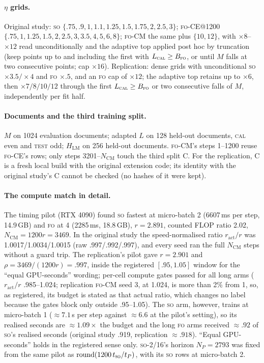 \documentclass[11pt]{article}
\newcommand{\FO}{\textsc{fo}}
\newcommand{\SO}{\textsc{so}}
\newcommand{\SOp}{\textsc{so}-2/16}
\begin{document}
\paragraph{$\eta$ grids.} Original study: \SO{} $\{.75,\allowbreak .9,\allowbreak 1,\allowbreak 1.1,\allowbreak 1.25,\allowbreak 1.5,\allowbreak 1.75, 2, 2.5,\allowbreak 3\}$; \FO-CE@1200
$\{.75,\allowbreak 1,\allowbreak 1.25,\allowbreak 1.5, 2, 2.5,\allowbreak 3,\allowbreak 3.5,\allowbreak 4,\allowbreak 5,\allowbreak 6,\allowbreak 8\}$; \FO-CM{} the same plus $\{10,\allowbreak 12\}$, with $\times8$--$\times12$
read unconditionally and the adaptive top applied post hoc by truncation (keep points up to and
including the first with $L_{\textsc{cal}}\ge B_{\FO}$, or until $M$ falls at two consecutive points;
cap $\times16$). Replication: dense grids with unconditional \SO{} $\times3.5/\times4$ and \FO{}
$\times.5$, and an \FO{} cap of $\times12$; the adaptive top retains up to $\times6$, then
$\times7/8/10/12$ through the first $L_{\textsc{cal}}\ge B_{\FO}$ or two consecutive falls of $M$,
independently per fit half.

\paragraph{Documents and the third training split.} $M$ on 1024 evaluation documents; adapted $L$ on
128 held-out documents, \textsc{cal} even and \textsc{test} odd; $H_{\text{LM}}$ on 256 held-out
documents. \FO-CM's steps 1--1200 reuse \FO-CE's rows; only steps 3201--$N_{\text{CM}}$ touch the third
split C. For the replication, C is a fresh local build with the original extension code; its identity
with the original study's C cannot be checked (no hashes of it were kept).

\paragraph{The compute match in detail.} The timing pilot (RTX 4090) found \SO{} fastest at
micro-batch 2 (6607\,ms per step, 14.9\,GB) and \FO{} at 4 (2285\,ms, 18.8\,GB), $r=2.891$, counted
FLOP ratio 2.02, $N_{\text{CM}}=1200r=3469$. In the original study the speed-normalised ratio
$r_{\text{act}}/r$ was 1.0017/1.0034/1.0015 (raw .997/.992/.997), and every seed ran the full
$N_{\text{CM}}$ steps without a guard trip. The replication's pilot gave $r=2.901$ and
$\rho=3469/(1200r)=.997$, inside the registered $[.95,1.05]$ window for the ``equal GPU-seconds''
wording; per-cell compute gates passed for all long arms ($r_{\text{act}}/r$ .985--1.024; replication
\FO-CM{} seed 3, at 1.024, is more than 2\% from 1, so, as registered, its budget is stated as that
actual ratio, which changes no label because the gates block only outside .95--1.05). The \SO{}
arm, however, trains at micro-batch 1 ($\approx7.1$\,s per step against $\approx6.6$ at the pilot's
setting), so its realised seconds are $\approx1.09\times$ the budget and the long \FO{} arms received
$\approx.92$ of \SO's realised seconds (original study .919, replication $\approx.918$). ``Equal
GPU-seconds'' holds in the registered sense only. \SOp's horizon $N_P=2793$ was fixed from the same
pilot as $\mathrm{round}(1200\,t_{\SO}/t_P)$, with its \SO{} rows at micro-batch 2.
\end{document}
